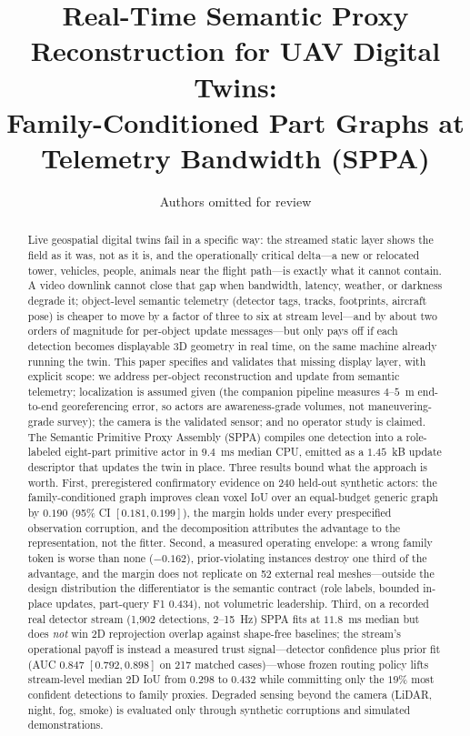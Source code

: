 \documentclass[11pt,a4paper]{article}
\title{Real-Time Semantic Proxy Reconstruction for UAV Digital Twins:\\
Family-Conditioned Part Graphs at Telemetry Bandwidth (SPPA)}
\author{Authors omitted for review}
\date{}
\begin{document}
\maketitle

\begin{abstract}
Live geospatial digital twins fail in a specific way: the streamed static
layer shows the field as it was, not as it is, and the operationally
critical delta---a new or relocated tower, vehicles, people, animals near
the flight path---is exactly what it cannot contain. A video downlink cannot
close that gap when bandwidth, latency, weather, or darkness degrade it;
object-level semantic telemetry (detector tags, tracks, footprints, aircraft
pose) is cheaper to move by a factor of three to six at stream level---and by
about two orders of magnitude for per-object update messages---but only pays
off if each detection becomes displayable 3D geometry in real time, on the
same machine already running the twin. This paper specifies and validates that missing
display layer, with explicit scope: we address per-object reconstruction and
update from semantic telemetry; localization is assumed given (the companion
pipeline measures \(4\)--\(5\)~m end-to-end georeferencing error, so actors
are awareness-grade volumes, not maneuvering-grade survey); the camera is
the validated sensor; and no operator study is claimed. The Semantic
Primitive Proxy Assembly (SPPA) compiles one detection into a role-labeled
eight-part primitive actor in \(9.4\)~ms median CPU, emitted as a
\(1.45\)~kB update descriptor that updates the twin in place. Three results
bound what the approach is worth. First, preregistered confirmatory evidence
on 240 held-out synthetic actors: the family-conditioned graph improves
clean voxel IoU over an equal-budget generic graph by \(0.190\) (95\% CI
\([0.181,0.199]\)), the margin holds under every prespecified observation
corruption, and the decomposition attributes the advantage to the
representation, not the fitter. Second, a measured operating envelope: a
wrong family token is worse than none (\(-0.162\)), prior-violating
instances destroy one third of the advantage, and the margin does not
replicate on 52 external real meshes---outside the design distribution the
differentiator is the semantic contract (role labels, bounded in-place
updates, part-query F1 \(0.434\)), not volumetric leadership. Third, on a
recorded real detector stream (1{,}902 detections, 2--15~Hz) SPPA fits at
\(11.8\)~ms median but does \emph{not} win 2D reprojection overlap against
shape-free baselines; the stream's operational payoff is instead a measured
trust signal---detector confidence plus prior fit (AUC \(0.847\)
\([0.792,0.898]\) on 217 matched cases)---whose frozen routing policy lifts
stream-level median 2D IoU from \(0.298\) to \(0.432\) while committing only
the \(19\%\) most confident detections to family proxies. Degraded sensing
beyond the camera (LiDAR, night, fog, smoke) is evaluated only through
synthetic corruptions and simulated demonstrations.
\end{abstract}
\end{document}
